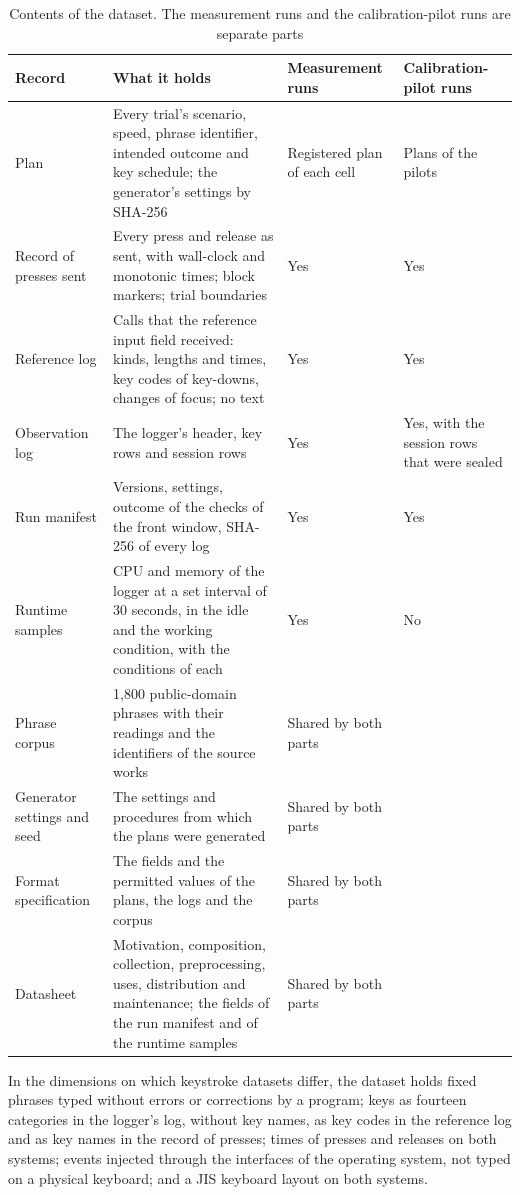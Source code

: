 \begin{table}[t]
\caption{Contents of the dataset. The measurement runs and the calibration-pilot runs are separate parts}
\label{tab:dataset}
\begin{tabular}{L{0.20}L{0.40}L{0.20}L{0.20}}
\toprule
Record & What it holds & Measurement runs & Calibration-pilot runs \\
\midrule
Plan & Every trial's scenario, speed, phrase identifier, intended outcome and key schedule; the generator's settings by SHA-256 & Registered plan of each cell & Plans of the pilots \\
Record of presses sent & Every press and release as sent, with wall-clock and monotonic times; block markers; trial boundaries & Yes & Yes \\
Reference log & Calls that the reference input field received: kinds, lengths and times, key codes of key-downs, changes of focus; no text & Yes & Yes \\
Observation log & The logger's header, key rows and session rows & Yes & Yes, with the session rows that were sealed \\
Run manifest & Versions, settings, outcome of the checks of the front window, SHA-256 of every log & Yes & Yes \\
Runtime samples & CPU and memory of the logger at a set interval of 30 seconds, in the idle and the working condition, with the conditions of each & Yes & No \\
Phrase corpus & 1{,}800 public-domain phrases with their readings and the identifiers of the source works & Shared by both parts & \\
Generator settings and seed & The settings and procedures from which the plans were generated & Shared by both parts & \\
Format specification & The fields and the permitted values of the plans, the logs and the corpus & Shared by both parts & \\
Datasheet & Motivation, composition, collection, preprocessing, uses, distribution and maintenance; the fields of the run manifest and of the runtime samples & Shared by both parts & \\
\bottomrule
\end{tabular}
\end{table}

In the dimensions on which keystroke datasets differ, the dataset holds fixed phrases typed without errors or
corrections by a program; keys as fourteen categories in the logger's log, without key names, as key codes in the
reference log and as key names in the record of presses; times of presses and releases on both systems; events injected through the
interfaces of the operating system, not typed on a physical keyboard; and a JIS keyboard layout on both systems.

